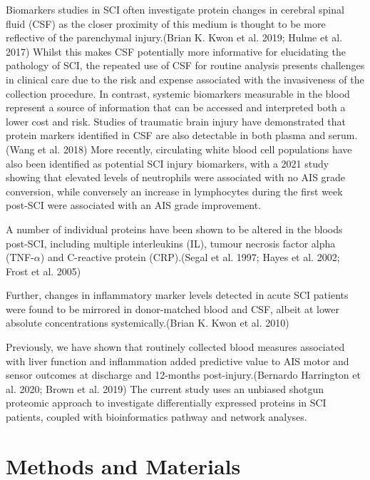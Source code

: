 \documentclass[9pt,lineno]{elife}
\begin{document}
Biomarkers studies in SCI often investigate protein changes in cerebral spinal fluid (CSF) as the closer proximity of this medium is thought to be more reflective of the parenchymal injury.(Brian K. Kwon et al. 2019; Hulme et al. 2017)
Whilst this makes CSF potentially more informative for elucidating the pathology of SCI, the repeated use of CSF for routine analysis presents challenges in clinical care due to the risk and expense associated with the invasiveness of the collection procedure. In contrast, systemic biomarkers measurable in the blood represent a source of information that can be accessed and interpreted both a lower cost and risk. Studies of traumatic brain injury have demonstrated that protein markers identified in CSF are also detectable in both plasma and serum.(Wang et al. 2018) More recently, circulating white blood cell populations have also been identified as potential SCI injury biomarkers, with a 2021 study showing that elevated levels of neutrophils were associated with no AIS grade conversion, while conversely an increase in lymphocytes during the first week post-SCI were associated with an AIS grade improvement.

A number of individual proteins have been shown to be altered in the bloods post-SCI, including multiple interleukins (IL), tumour necrosis factor alpha (TNF-\(\alpha\)) and C-reactive protein (CRP).(Segal et al. 1997; Hayes et al. 2002; Frost et al. 2005)

Further, changes in inflammatory marker levels detected in acute SCI patients were found to be mirrored in donor-matched blood and CSF, albeit at lower absolute concentrations systemically.(Brian K. Kwon et al. 2010)

Previously, we have shown that routinely collected blood measures associated with liver function and inflammation added predictive value to AIS motor and sensor outcomes at discharge and 12-months post-injury.(Bernardo Harrington et al. 2020; Brown et al. 2019) The current study uses an unbiased shotgun proteomic approach to investigate differentially expressed proteins in SCI patients, coupled with bioinformatics pathway and network analyses.

\hypertarget{methods-and-materials}{%
\section{Methods and Materials}\label{methods-and-materials}}
\end{document}

